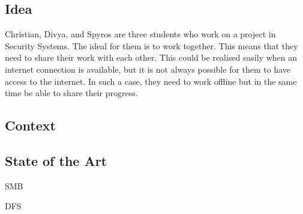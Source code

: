 
\subsection{Idea}

Christian, Divya, and Spyros are three students who work on a project in Security Systems. The ideal for them is to work together. This means that they need to share their work with each other. This could be realised easily when an internet connection is available, but it is not always possible for them to have access to the internet. In such a case, they need to work offline but in the same time be able to share their progress.

\subsection{Context}

\subsection{State of the Art}
%

SMB

DFS